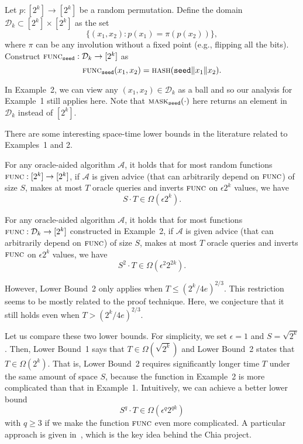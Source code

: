 \documentclass[conference]{IEEEtran}
\newcommand{\seed}{\texttt{seed}}
\newcommand{\mask}{\textsc{mask}}
\newcommand{\func}{\textsc{func}}
\newcommand{\hash}{\textsc{hash}}
\begin{document}

 Let $p: [2^k] \to [2^k]$ be a random permutation. Define the domain $\mathcal{D}_k \subset [2^k] \times [2^k]$ as the set 
\[
\{ (x_1, x_2) : p(x_1) = \pi\left( p(x_2) \right) \},
\]
where $\pi$ can be any involution without a fixed point (e.g., flipping all the bits).
Construct $\func_{\seed}: \mathcal{D}_k \to [2^k]$ as 
\[
\func_{\seed}(x_1, x_2) = \hash(\seed \| x_1 \| x_2).
\]

In Example~2, we can view any $(x_1, x_2) \in \mathcal{D}_k$ as a ball and so
our analysis for Example~1 still applies here. 
Note that $\mask_{\seed}(\cdot)$ here returns an element in $\mathcal{D}_k$ instead of $[2^k]$.

There are some interesting space-time lower bounds in the literature 
related to Examples~1 and 2. 

For any oracle-aided algorithm $\mathcal{A}$, it holds that for most random functions
$\func: [2^k] \to [2^k]$, if $\mathcal{A}$ is given advice (that can arbitrarily depend on $\func$)
of size $S$, makes at most $T$ oracle queries and inverts $\func$ on $\epsilon 2^k$ values, we have
\begin{equation}
    S \cdot T \in \Omega\left(\epsilon 2^k \right).
\end{equation}


For any oracle-aided algorithm $\mathcal{A}$, it holds that for most functions
$\func: \mathcal{D}_k \to [2^k]$ constructed in Example~2, if $\mathcal{A}$ is given advice (that can arbitrarily depend on $\func$)
of size $S$, makes at most $T$ oracle queries and inverts $\func$ on $\epsilon 2^k$ values, we have
\begin{equation}
    S^2 \cdot T \in \Omega\left(\epsilon^2 2^{2k} \right).
\end{equation}

However, Lower Bound~2 only applies when $T \le \left(2^k/4 e \right)^{2/3}$. This restriction seems to be mostly related to the proof technique. Here, we conjecture that it still holds even when $T > \left(2^k/4 e \right)^{2/3}$.

Let us compare these two lower bounds. For simplicity, we set $\epsilon = 1$ and $S = \sqrt{2^k}$. Then, Lower Bound~1 says that 
$T \in \Omega\left(\sqrt{2^k} \right)$ and Lower Bound~2 states that $T \in \Omega\left( 2^k \right)$.
That is, Lower Bound~2 requires significantly longer time $T$ under the same amount of space $S$, because the function in Example~2 is more complicated than that in Example~1.
Intuitively, we can achieve a better lower bound 
\[
S^q \cdot T \in \Omega\left(\epsilon^q 2^{qk} \right)
\]
with $q \ge 3$ if we make the function $\func$ even more complicated. A particular approach is given in~\cite{beyond_hellman}, which is the key idea behind the Chia project.
\end{document}
